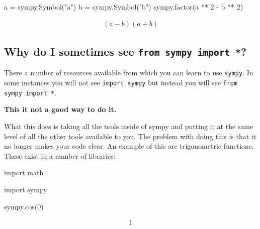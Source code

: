 \begin{pyin}
a = sympy.Symbol("a")
b = sympy.Symbol("b")
sympy.factor(a ** 2 - b ** 2)
\end{pyin}




\begin{equation*}
\begin{split}\displaystyle \left(a - b\right) \left(a + b\right)\end{split}
\end{equation*}




\subsection{Why do I sometimes see \texttt{from sympy import *}?}
\label{\detokenize{tools-for-mathematics/02-algebra/why/main:why-do-i-sometimes-see-from-sympy-import}}

There a number of resources available from which you can learn to use \texttt{sympy}. In
some instances you will not see \texttt{import sympy} but instead you will see 
\texttt{from sympy import *}.


\textbf{This it not a good way to do it.}


What this does is taking all the tools inside of sympy and putting it at the
same level of all the other tools available to you.
The problem with doing this is that it no longer makes your code clear.
An example of this are trigonometric functions. These exist in a number of
libraries:

\begin{pyin}
import math
\end{pyin}







\begin{pyin}
import sympy
\end{pyin}







\begin{pyin}
sympy.cos(0)
\end{pyin}




\begin{equation*}
\begin{split}\displaystyle 1\end{split}
\end{equation*}







